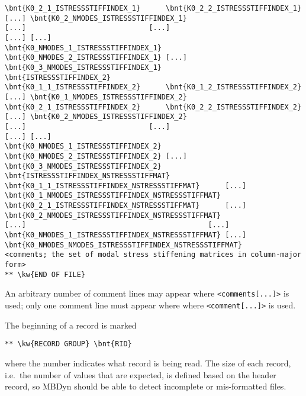 {\begin{Verbatim}[commandchars=\\\{\}]
\bnt{K0_2_1_ISTRESSSTIFFINDEX_1}      \bnt{K0_2_2_ISTRESSSTIFFINDEX_1}      [...] \bnt{K0_2_NMODES_ISTRESSSTIFFINDEX_1}
[...]                             [...]                             [...] [...]
\bnt{K0_NMODES_1_ISTRESSSTIFFINDEX_1} \bnt{K0_NMODES_2_ISTRESSSTIFFINDEX_1} [...] \bnt{K0_3_NMODES_ISTRESSSTIFFINDEX_1}
\bnt{ISTRESSSTIFFINDEX_2}
\bnt{K0_1_1_ISTRESSSTIFFINDEX_2}      \bnt{K0_1_2_ISTRESSSTIFFINDEX_2}      [...] \bnt{K0_1_NMODES_ISTRESSSTIFFINDEX_2}
\bnt{K0_2_1_ISTRESSSTIFFINDEX_2}      \bnt{K0_2_2_ISTRESSSTIFFINDEX_2}      [...] \bnt{K0_2_NMODES_ISTRESSSTIFFINDEX_2}
[...]                             [...]                             [...] [...]
\bnt{K0_NMODES_1_ISTRESSSTIFFINDEX_2} \bnt{K0_NMODES_2_ISTRESSSTIFFINDEX_2} [...] \bnt{K0_3_NMODES_ISTRESSSTIFFINDEX_2}
\bnt{ISTRESSSTIFFINDEX_NSTRESSSTIFFMAT}
\bnt{K0_1_1_ISTRESSSTIFFINDEX_NSTRESSSTIFFMAT}      [...] \bnt{K0_1_NMODES_ISTRESSSTIFFINDEX_NSTRESSSTIFFMAT}
\bnt{K0_2_1_ISTRESSSTIFFINDEX_NSTRESSSTIFFMAT}      [...] \bnt{K0_2_NMODES_ISTRESSSTIFFINDEX_NSTRESSSTIFFMAT}
[...]                                           [...]
\bnt{K0_NMODES_1_ISTRESSSTIFFINDEX_NSTRESSSTIFFMAT} [...] \bnt{K0_NMODES_NMODES_ISTRESSSTIFFINDEX_NSTRESSSTIFFMAT}
<comments; the set of modal stress stiffening matrices in column-major form>
** \kw{END OF FILE}
\end{Verbatim}
}

An arbitrary number of comment lines may appear
where \texttt{<comments[...]>} is used;
only one comment line must appear where
where \texttt{<comment[...]>} is used.

The beginning of a record is marked
\begin{Verbatim}[commandchars=\\\{\}]
** \kw{RECORD GROUP} \bnt{RID}
\end{Verbatim}
where the number  indicates what record is being read.
The size of each record, i.e.\ the number of values that are expected,
is defined based on the header record, so MBDyn should be able to detect
incomplete or mis-formatted files.

